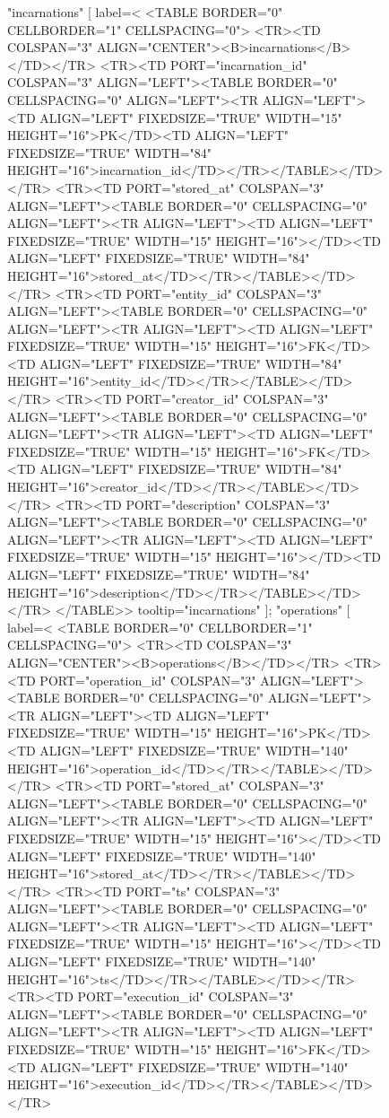 \begin{figure}[t]
{  "incarnations" [
   label=<
    <TABLE BORDER="0" CELLBORDER="1" CELLSPACING="0">
      <TR><TD COLSPAN="3" ALIGN="CENTER"><B>incarnations</B></TD></TR>
      <TR><TD PORT="incarnation_id" COLSPAN="3" ALIGN="LEFT"><TABLE BORDER="0" CELLSPACING="0" ALIGN="LEFT"><TR ALIGN="LEFT"><TD ALIGN="LEFT" FIXEDSIZE="TRUE" WIDTH="15" HEIGHT="16">PK</TD><TD ALIGN="LEFT" FIXEDSIZE="TRUE" WIDTH="84" HEIGHT="16">incarnation_id</TD></TR></TABLE></TD></TR>
      <TR><TD PORT="stored_at" COLSPAN="3" ALIGN="LEFT"><TABLE BORDER="0" CELLSPACING="0" ALIGN="LEFT"><TR ALIGN="LEFT"><TD ALIGN="LEFT" FIXEDSIZE="TRUE" WIDTH="15" HEIGHT="16"></TD><TD ALIGN="LEFT" FIXEDSIZE="TRUE" WIDTH="84" HEIGHT="16">stored_at</TD></TR></TABLE></TD></TR>
      <TR><TD PORT="entity_id" COLSPAN="3" ALIGN="LEFT"><TABLE BORDER="0" CELLSPACING="0" ALIGN="LEFT"><TR ALIGN="LEFT"><TD ALIGN="LEFT" FIXEDSIZE="TRUE" WIDTH="15" HEIGHT="16">FK</TD><TD ALIGN="LEFT" FIXEDSIZE="TRUE" WIDTH="84" HEIGHT="16">entity_id</TD></TR></TABLE></TD></TR>
      <TR><TD PORT="creator_id" COLSPAN="3" ALIGN="LEFT"><TABLE BORDER="0" CELLSPACING="0" ALIGN="LEFT"><TR ALIGN="LEFT"><TD ALIGN="LEFT" FIXEDSIZE="TRUE" WIDTH="15" HEIGHT="16">FK</TD><TD ALIGN="LEFT" FIXEDSIZE="TRUE" WIDTH="84" HEIGHT="16">creator_id</TD></TR></TABLE></TD></TR>
      <TR><TD PORT="description" COLSPAN="3" ALIGN="LEFT"><TABLE BORDER="0" CELLSPACING="0" ALIGN="LEFT"><TR ALIGN="LEFT"><TD ALIGN="LEFT" FIXEDSIZE="TRUE" WIDTH="15" HEIGHT="16"></TD><TD ALIGN="LEFT" FIXEDSIZE="TRUE" WIDTH="84" HEIGHT="16">description</TD></TR></TABLE></TD></TR>
    </TABLE>>
    tooltip="incarnations"
  ];
  "operations" [
   label=<
    <TABLE BORDER="0" CELLBORDER="1" CELLSPACING="0">
      <TR><TD COLSPAN="3" ALIGN="CENTER"><B>operations</B></TD></TR>
      <TR><TD PORT="operation_id" COLSPAN="3" ALIGN="LEFT"><TABLE BORDER="0" CELLSPACING="0" ALIGN="LEFT"><TR ALIGN="LEFT"><TD ALIGN="LEFT" FIXEDSIZE="TRUE" WIDTH="15" HEIGHT="16">PK</TD><TD ALIGN="LEFT" FIXEDSIZE="TRUE" WIDTH="140" HEIGHT="16">operation_id</TD></TR></TABLE></TD></TR>
      <TR><TD PORT="stored_at" COLSPAN="3" ALIGN="LEFT"><TABLE BORDER="0" CELLSPACING="0" ALIGN="LEFT"><TR ALIGN="LEFT"><TD ALIGN="LEFT" FIXEDSIZE="TRUE" WIDTH="15" HEIGHT="16"></TD><TD ALIGN="LEFT" FIXEDSIZE="TRUE" WIDTH="140" HEIGHT="16">stored_at</TD></TR></TABLE></TD></TR>
      <TR><TD PORT="ts" COLSPAN="3" ALIGN="LEFT"><TABLE BORDER="0" CELLSPACING="0" ALIGN="LEFT"><TR ALIGN="LEFT"><TD ALIGN="LEFT" FIXEDSIZE="TRUE" WIDTH="15" HEIGHT="16"></TD><TD ALIGN="LEFT" FIXEDSIZE="TRUE" WIDTH="140" HEIGHT="16">ts</TD></TR></TABLE></TD></TR>
      <TR><TD PORT="execution_id" COLSPAN="3" ALIGN="LEFT"><TABLE BORDER="0" CELLSPACING="0" ALIGN="LEFT"><TR ALIGN="LEFT"><TD ALIGN="LEFT" FIXEDSIZE="TRUE" WIDTH="15" HEIGHT="16">FK</TD><TD ALIGN="LEFT" FIXEDSIZE="TRUE" WIDTH="140" HEIGHT="16">execution_id</TD></TR></TABLE></TD></TR>
}
\end{figure}
